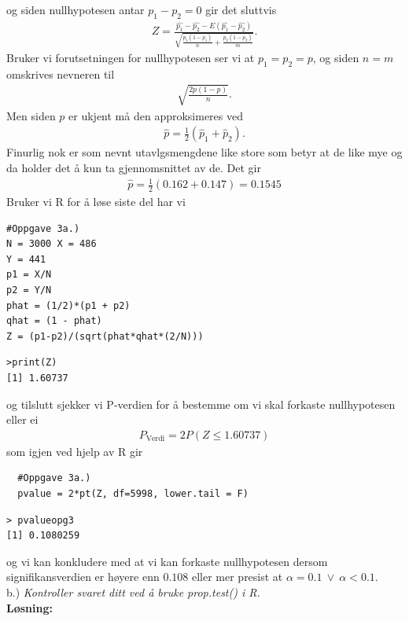 \documentclass[12pt,
               a4paper,
               article,
               oneside,
               oldfontcommands,
               norsk]{memoir}
\begin{document}
og siden nullhypotesen antar $p_{1} - p_{2} = 0$ gir det sluttvis 
\begin{align*}
  Z = \frac{\hat{p_{1}} - \hat{p_{2}} - E \left( \hat{p_{1}} - \hat{p_{2}}\right)}{\sqrt{\frac{p_{1}(1 - p_{1})}{n} + \frac{p_{2}(1 - p_{2})}{m}}}.
\end{align*}
Bruker vi forutsetningen for nullhypotesen ser vi at $p_{1} = p_{2} = p$, og siden $n = m$ omskrives nevneren til 
\begin{align*}
\sqrt{\frac{2p(1-p)}{n}}.
\end{align*}
Men siden $p$ er ukjent må den approksimeres ved 
\begin{align*}
  \hat{p} = \frac{1}{2} \left(\hat{p}_{1} + \hat{p}_{2} \right).
\end{align*}
Finurlig nok er som nevnt utavlgsmengdene like store som betyr at de  like mye og da holder det å kun ta gjennomsnittet av de. Det gir 
\begin{align*}
  \hat{p} = \frac{1}{2} \left(0.162 + 0.147 \right) = 0.1545
\end{align*}
Bruker vi R for å løse siste del har vi 
\begin{lstlisting}
#Oppgave 3a.)
N = 3000 X = 486
Y = 441
p1 = X/N
p2 = Y/N
phat = (1/2)*(p1 + p2)
qhat = (1 - phat)
Z = (p1-p2)/(sqrt(phat*qhat*(2/N)))
  \end{lstlisting}
  \begin{verbatim} 
>print(Z)
[1] 1.60737 
  \end{verbatim}
og tilslutt sjekker vi P-verdien for å bestemme om vi skal forkaste nullhypotesen eller ei 
\begin{align*}
  P_{\text{Verdi}} = 2P(Z \leq 1.60737)
\end{align*}
som igjen ved hjelp av R gir 
\begin{lstlisting}
  #Oppgave 3a.)
  pvalue = 2*pt(Z, df=5998, lower.tail = F)
\end{lstlisting}
\begin{verbatim} 
> pvalueopg3
[1] 0.1080259
\end{verbatim}
og vi kan konkludere med at vi kan forkaste nullhypotesen dersom signifikansverdien er høyere enn $0.108$ eller mer presist at $\alpha = 0.1 \ \lor \ \alpha < 0.1$. \vspace{4mm}\\ 
b.) \emph{Kontroller svaret ditt ved å bruke prop.test() i R.}\vspace{4mm}\\ 
\textbf{Løsning:}\vspace{4mm}\\
\end{document}
